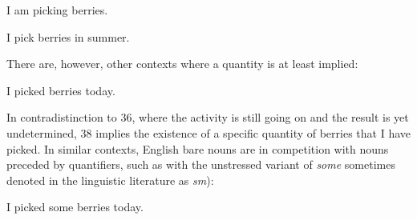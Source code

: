 \begin{listWWNumileveli}
\item {}

\begin{styleExample}
\label{bkm:Ref78699401}I am picking berries.

\end{styleExample}

\item {}

\begin{styleExample}
\label{bkm:Ref95014405}I pick berries in summer.

\end{styleExample}

\end{listWWNumileveli}

\begin{styleBodyTextFirst}
There are, however, other contexts where a quantity is at least implied:

\end{styleBodyTextFirst}

\begin{listWWNumileveli}
\item {}

\begin{styleExample}
\label{bkm:Ref78699451}I picked berries today. 

\end{styleExample}

\end{listWWNumileveli}

\begin{styleBodyTextFirst}
In contradistinction to 36, where the activity is still going on and the result is yet undetermined, 38 implies the existence of a specific quantity of berries that I have picked. In similar contexts, English bare nouns are in competition with nouns preceded by quantifiers, such as with the unstressed variant of \textit{some} sometimes denoted in the linguistic literature as \textit{sm}):

\end{styleBodyTextFirst}

\begin{listWWNumileveli}
\item {}

\begin{styleExample}
I picked some berries today.

\end{styleExample}

\end{listWWNumileveli}

